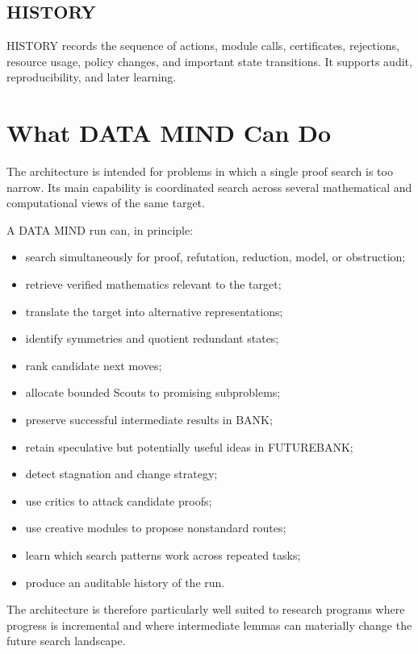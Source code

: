\documentclass[11pt]{article}
\begin{document}
\subsection{HISTORY}

HISTORY records the sequence of actions, module calls, certificates, rejections, resource usage, policy changes, and important state transitions. It supports audit, reproducibility, and later learning.

\section{What DATA MIND Can Do}

The architecture is intended for problems in which a single proof search is too narrow. Its main capability is coordinated search across several mathematical and computational views of the same target.

A DATA MIND run can, in principle:
\begin{itemize}
\item search simultaneously for proof, refutation, reduction, model, or obstruction;
\item retrieve verified mathematics relevant to the target;
\item translate the target into alternative representations;
\item identify symmetries and quotient redundant states;
\item rank candidate next moves;
\item allocate bounded Scouts to promising subproblems;
\item preserve successful intermediate results in BANK;
\item retain speculative but potentially useful ideas in FUTUREBANK;
\item detect stagnation and change strategy;
\item use critics to attack candidate proofs;
\item use creative modules to propose nonstandard routes;
\item learn which search patterns work across repeated tasks;
\item produce an auditable history of the run.
\end{itemize}

The architecture is therefore particularly well suited to research programs where progress is incremental and where intermediate lemmas can materially change the future search landscape.
\end{document}
